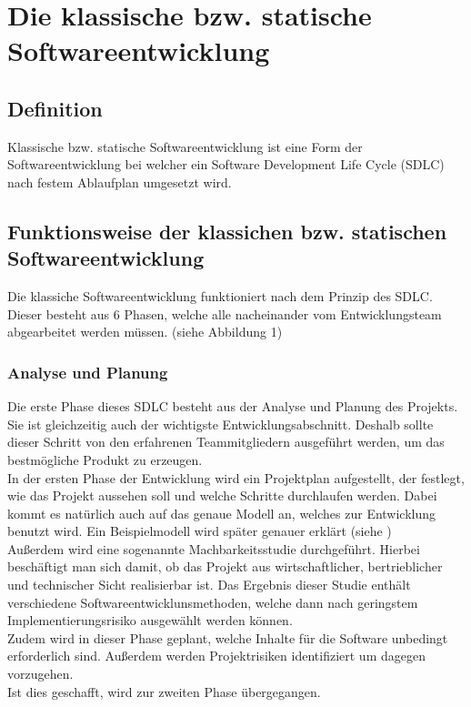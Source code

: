 \documentclass[a4paper, 10pt]{scrartcl}
\begin{document}
\section{Die klassische bzw. statische Softwareentwicklung}
\subsection{Definition}
\begin{center}
\large{Klassische bzw. statische Softwareentwicklung ist eine Form der Softwareentwicklung bei welcher ein \glqq Software Development Life Cycle (SDLC)\grqq{} nach festem Ablaufplan umgesetzt wird. \citep{stoica}} 
\end{center}
\subsection{Funktionsweise der klassichen bzw. statischen Softwareentwicklung}
Die klassiche Softwareentwicklung funktioniert nach dem Prinzip des SDLC. Dieser besteht aus 6 Phasen, welche alle nacheinander vom Entwicklungsteam abgearbeitet werden müssen. \citep{stoica} (siehe Abbildung 1)
\subsubsection{Analyse und Planung}
Die erste Phase dieses SDLC besteht aus der Analyse und Planung des Projekts. Sie ist gleichzeitig auch der wichtigste Entwicklungsabschnitt. Deshalb sollte dieser Schritt von den erfahrenen Teammitgliedern ausgeführt werden, um das bestmögliche Produkt zu erzeugen.\\  
In der ersten Phase der Entwicklung wird ein Projektplan aufgestellt, der festlegt, wie das Projekt aussehen soll und welche Schritte durchlaufen werden. Dabei kommt es natürlich auch auf das genaue Modell an, welches zur Entwicklung benutzt wird. Ein Beispielmodell wird später genauer erklärt (siehe ) \\
Außerdem wird eine sogenannte Machbarkeitsstudie durchgeführt. Hierbei beschäftigt man sich damit, ob das Projekt aus wirtschaftlicher, bertrieblicher und technischer Sicht realisierbar ist. Das Ergebnis dieser Studie enthält verschiedene Softwareentwicklunsmethoden, welche dann nach geringstem Implementierungsrisiko ausgewählt werden können.\\
Zudem wird in dieser Phase geplant, welche Inhalte für die Software unbedingt erforderlich sind. Außerdem werden Projektrisiken identifiziert um dagegen vorzugehen. \citep{stoica}\\
Ist dies geschafft, wird zur zweiten Phase übergegangen.
\end{document}
